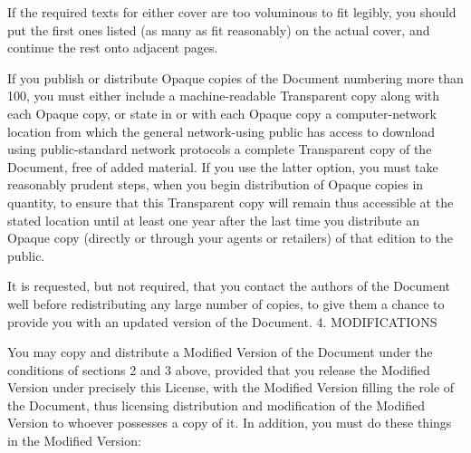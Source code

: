 {\begin{multicols}{4}
If the required texts for either cover are too voluminous to fit legibly, you should put the first ones listed (as many as fit reasonably) on the actual cover, and continue the rest onto adjacent pages.

If you publish or distribute Opaque copies of the Document numbering more than 100, you must either include a machine-readable Transparent copy along with each Opaque copy, or state in or with each Opaque copy a computer-network location from which the general network-using public has access to download using public-standard network protocols a complete Transparent copy of the Document, free of added material. If you use the latter option, you must take reasonably prudent steps, when you begin distribution of Opaque copies in quantity, to ensure that this Transparent copy will remain thus accessible at the stated location until at least one year after the last time you distribute an Opaque copy (directly or through your agents or retailers) of that edition to the public.

It is requested, but not required, that you contact the authors of the Document well before redistributing any large number of copies, to give them a chance to provide you with an updated version of the Document.
4. MODIFICATIONS

You may copy and distribute a Modified Version of the Document under the conditions of sections 2 and 3 above, provided that you release the Modified Version under precisely this License, with the Modified Version filling the role of the Document, thus licensing distribution and modification of the Modified Version to whoever possesses a copy of it. In addition, you must do these things in the Modified Version:


\end{multicols}}
